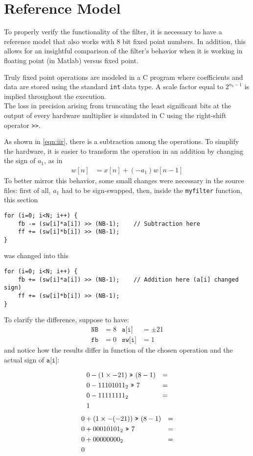 \section{Reference Model}
To properly verify the functionality of the filter, it is necessary to have a reference model that also works with 8 bit fixed point numbers. In addition, this allows for an insightful comparison of the filter's behavior when it is working in floating point (in Matlab) versus fixed point.


Truly fixed point operations are modeled in a C program where coefficients and data are stored using the standard \texttt{int} data type. A scale factor equal to $2^{n_b-1}$ is implied throughout the execution.\\
The loss in precision arising from truncating the least significant bits at the output of every hardware multiplier is simulated in C using the right-shift operator \texttt{>>}.

As shown in \autoref{eqn:iir}, there is a subtraction among the operations. To simplify the hardware, it is easier to transform the operation in an addition by changing the sign of $a_1$, as in
\begin{align}
	w[n] &= x[n] + (- a_1) w[n-1]
\end{align}
To better mirror this behavior, some small changes were necessary in the source files: first of all, $a_1$ had to be sign-swapped, then, inside the \texttt{myfilter} function, this section
\begin{Verbatim}
for (i=0; i<N; i++) {
	fb -= (sw[i]*a[i]) >> (NB-1);    // Subtraction here
	ff += (sw[i]*b[i]) >> (NB-1);
}
\end{Verbatim}
was changed into this
\begin{Verbatim}
for (i=0; i<N; i++) {
	fb += (sw[i]*a[i]) >> (NB-1);    // Addition here (a[i] changed sign)
	ff += (sw[i]*b[i]) >> (NB-1);
}
\end{Verbatim}
To clarify the difference, suppose to have:
\begin{align*}
	\texttt{NB} &= 8 & \texttt{a[i]} &= \pm21 \\
	\texttt{fb} &= 0 & \texttt{sw[i]} &= 1
\end{align*}
and notice how the results differ in function of the chosen operation and the actual sign of $\texttt{a[i]}$:
\setlength{\columnseprule}{0.4pt}
\begin{multicols}{2}
	\noindent
	\begin{align*}
		0 &- (1 \times -21) \ \texttt{>>}\  (8 - 1) &= \\
		0 &- 11101011_2 \ \texttt{>>}\  7 &= \\
		0 &- 11111111_2 &= \\
		1&
	\end{align*}
	\begin{align*}
		0 &+ (1 \times -(-21)) \ \texttt{>>}\  (8 - 1) &= \\
		0 &+ 00010101_2 \ \texttt{>>}\  7 &= \\
		0 &+ 00000000_2 &= \\
		0&
	\end{align*}
\end{multicols}
